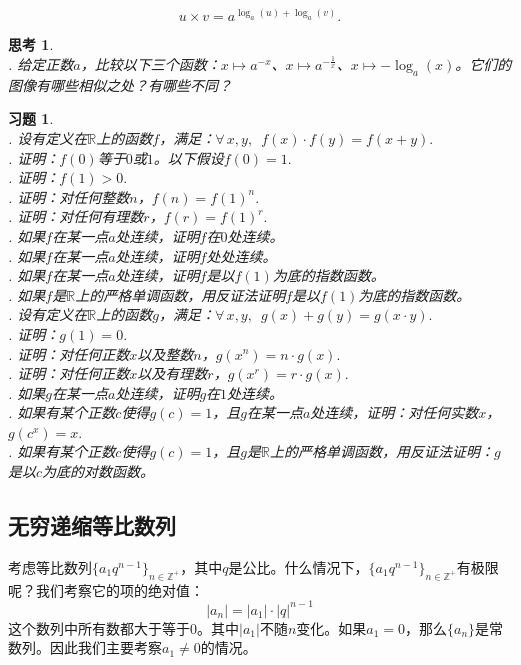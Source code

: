 \documentclass[12pt,UTF8]{ctexbook}
\newtheorem{sk}{思考}[section]
\newtheorem{xt}{习题}[section]
\begin{document}
$$ u \times v = a^{\log_a(u) + \log_a(v)}.$$

\begin{sk}
    \mbox{}\\
    . 给定正数$a$，比较以下三个函数：$x\mapsto a^{-x}$、$x\mapsto a^{-\frac{1}{x}}$、$x\mapsto -\log_a(x)$。它们的图像有哪些相似之处？有哪些不同？
\end{sk}

\begin{xt}
    \mbox{}\\
    . 设有定义在$\mathbb{R}$上的函数$f$，满足：$\forall \, x, y, \,\,\, f(x) \cdot f(y) = f(x + y).$\\
    . 证明：$f(0)$等于$0$或$1$。以下假设$f(0) = 1.$\\
    . 证明：$f(1) > 0.$\\
    . 证明：对任何整数$n$，$f(n) = f(1)^n.$\\
    . 证明：对任何有理数$r$，$f(r) = f(1)^r.$\\
    . 如果$f$在某一点$a$处连续，证明$f$在$0$处连续。\\
    . 如果$f$在某一点$a$处连续，证明$f$处处连续。\\
    . 如果$f$在某一点$a$处连续，证明$f$是以$f(1)$为底的指数函数。\\
    . 如果$f$是$\mathbb{R}$上的严格单调函数，用反证法证明$f$是以$f(1)$为底的指数函数。\\
    . 设有定义在$\mathbb{R}$上的函数$g$，满足：$\forall \, x, y, \,\,\, g(x) + g(y) = g(x \cdot y).$\\
    . 证明：$g(1) = 0.$\\
    . 证明：对任何正数$x$以及整数$n$，$g(x^n) = n\cdot g(x).$\\
    . 证明：对任何正数$x$以及有理数$r$，$g(x^r) = r\cdot g(x).$\\
    . 如果$g$在某一点$a$处连续，证明$g$在$1$处连续。\\
    . 如果有某个正数$c$使得$g(c) = 1$，且$g$在某一点$a$处连续，证明：对任何实数$x$，$g(c^x) = x.$\\
    . 如果有某个正数$c$使得$g(c) = 1$，且$g$是$\mathbb{R}$上的严格单调函数，用反证法证明：$g$是以$c$为底的对数函数。
\end{xt}

\subsection{无穷递缩等比数列}
考虑等比数列$\{a_1 q^{n-1}\}_{n\in\mathbb{Z}^+}$，其中$q$是公比。什么情况下，$\{a_1 q^{n-1}\}_{n\in\mathbb{Z}^+}$有极限呢？我们考察它的项的绝对值：
$$|a_n| = |a_1|\cdot|q|^{n-1}$$
这个数列中所有数都大于等于$0$。其中$|a_1|$不随$n$变化。如果$a_1=0$，那么$\{a_n\}$是常数列。因此我们主要考察$a_1 \neq 0$的情况。
\end{document}
